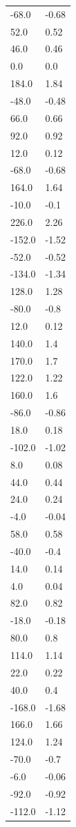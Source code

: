 \begin{longtable}{ll}
-68.0 & -0.68 \\
52.0 & 0.52 \\
46.0 & 0.46 \\
0.0 & 0.0 \\
184.0 & 1.84 \\
-48.0 & -0.48 \\
66.0 & 0.66 \\
92.0 & 0.92 \\
12.0 & 0.12 \\
-68.0 & -0.68 \\
164.0 & 1.64 \\
-10.0 & -0.1 \\
226.0 & 2.26 \\
-152.0 & -1.52 \\
-52.0 & -0.52 \\
-134.0 & -1.34 \\
128.0 & 1.28 \\
-80.0 & -0.8 \\
12.0 & 0.12 \\
140.0 & 1.4 \\
170.0 & 1.7 \\
122.0 & 1.22 \\
160.0 & 1.6 \\
-86.0 & -0.86 \\
18.0 & 0.18 \\
-102.0 & -1.02 \\
8.0 & 0.08 \\
44.0 & 0.44 \\
24.0 & 0.24 \\
-4.0 & -0.04 \\
58.0 & 0.58 \\
-40.0 & -0.4 \\
14.0 & 0.14 \\
4.0 & 0.04 \\
82.0 & 0.82 \\
-18.0 & -0.18 \\
80.0 & 0.8 \\
114.0 & 1.14 \\
22.0 & 0.22 \\
40.0 & 0.4 \\
-168.0 & -1.68 \\
166.0 & 1.66 \\
124.0 & 1.24 \\
-70.0 & -0.7 \\
-6.0 & -0.06 \\
-92.0 & -0.92 \\
-112.0 & -1.12 \\

\end{longtable}
